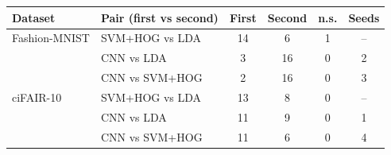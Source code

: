 \begin{tabular}{llcccc}
\toprule
Dataset & Pair (first vs second) & First & Second & n.s. & Seeds \\
\midrule
Fashion-MNIST & SVM+HOG vs LDA & 14 & 6 & 1 & -- \\
 & CNN vs LDA & 3 & 16 & 0 & 2 \\
 & CNN vs SVM+HOG & 2 & 16 & 0 & 3 \\
\midrule
ciFAIR-10 & SVM+HOG vs LDA & 13 & 8 & 0 & -- \\
 & CNN vs LDA & 11 & 9 & 0 & 1 \\
 & CNN vs SVM+HOG & 11 & 6 & 0 & 4 \\
\bottomrule
\end{tabular}
